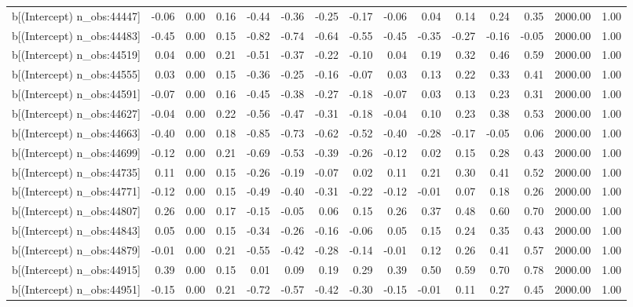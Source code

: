 \begin{table}[ht]
\begin{tabular}{rrrrrrrrrrrrrrr}
  b[(Intercept) n\_obs:44447] & -0.06 & 0.00 & 0.16 & -0.44 & -0.36 & -0.25 & -0.17 & -0.06 & 0.04 & 0.14 & 0.24 & 0.35 & 2000.00 & 1.00 \\ 
  b[(Intercept) n\_obs:44483] & -0.45 & 0.00 & 0.15 & -0.82 & -0.74 & -0.64 & -0.55 & -0.45 & -0.35 & -0.27 & -0.16 & -0.05 & 2000.00 & 1.00 \\ 
  b[(Intercept) n\_obs:44519] & 0.04 & 0.00 & 0.21 & -0.51 & -0.37 & -0.22 & -0.10 & 0.04 & 0.19 & 0.32 & 0.46 & 0.59 & 2000.00 & 1.00 \\ 
  b[(Intercept) n\_obs:44555] & 0.03 & 0.00 & 0.15 & -0.36 & -0.25 & -0.16 & -0.07 & 0.03 & 0.13 & 0.22 & 0.33 & 0.41 & 2000.00 & 1.00 \\ 
  b[(Intercept) n\_obs:44591] & -0.07 & 0.00 & 0.16 & -0.45 & -0.38 & -0.27 & -0.18 & -0.07 & 0.03 & 0.13 & 0.23 & 0.31 & 2000.00 & 1.00 \\ 
  b[(Intercept) n\_obs:44627] & -0.04 & 0.00 & 0.22 & -0.56 & -0.47 & -0.31 & -0.18 & -0.04 & 0.10 & 0.23 & 0.38 & 0.53 & 2000.00 & 1.00 \\ 
  b[(Intercept) n\_obs:44663] & -0.40 & 0.00 & 0.18 & -0.85 & -0.73 & -0.62 & -0.52 & -0.40 & -0.28 & -0.17 & -0.05 & 0.06 & 2000.00 & 1.00 \\ 
  b[(Intercept) n\_obs:44699] & -0.12 & 0.00 & 0.21 & -0.69 & -0.53 & -0.39 & -0.26 & -0.12 & 0.02 & 0.15 & 0.28 & 0.43 & 2000.00 & 1.00 \\ 
  b[(Intercept) n\_obs:44735] & 0.11 & 0.00 & 0.15 & -0.26 & -0.19 & -0.07 & 0.02 & 0.11 & 0.21 & 0.30 & 0.41 & 0.52 & 2000.00 & 1.00 \\ 
  b[(Intercept) n\_obs:44771] & -0.12 & 0.00 & 0.15 & -0.49 & -0.40 & -0.31 & -0.22 & -0.12 & -0.01 & 0.07 & 0.18 & 0.26 & 2000.00 & 1.00 \\ 
  b[(Intercept) n\_obs:44807] & 0.26 & 0.00 & 0.17 & -0.15 & -0.05 & 0.06 & 0.15 & 0.26 & 0.37 & 0.48 & 0.60 & 0.70 & 2000.00 & 1.00 \\ 
  b[(Intercept) n\_obs:44843] & 0.05 & 0.00 & 0.15 & -0.34 & -0.26 & -0.16 & -0.06 & 0.05 & 0.15 & 0.24 & 0.35 & 0.43 & 2000.00 & 1.00 \\ 
  b[(Intercept) n\_obs:44879] & -0.01 & 0.00 & 0.21 & -0.55 & -0.42 & -0.28 & -0.14 & -0.01 & 0.12 & 0.26 & 0.41 & 0.57 & 2000.00 & 1.00 \\ 
  b[(Intercept) n\_obs:44915] & 0.39 & 0.00 & 0.15 & 0.01 & 0.09 & 0.19 & 0.29 & 0.39 & 0.50 & 0.59 & 0.70 & 0.78 & 2000.00 & 1.00 \\ 
  b[(Intercept) n\_obs:44951] & -0.15 & 0.00 & 0.21 & -0.72 & -0.57 & -0.42 & -0.30 & -0.15 & -0.01 & 0.11 & 0.27 & 0.45 & 2000.00 & 1.00 \\ 

\end{tabular}
\end{table}
